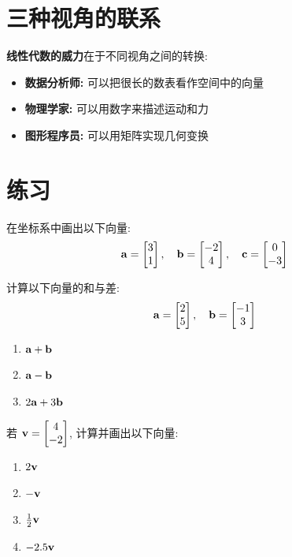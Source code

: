 \section{三种视角的联系}

\begin{summary}
\textbf{线性代数的威力}在于不同视角之间的转换:
\begin{itemize}
    \item \textbf{数据分析师:} 可以把很长的数表看作空间中的向量
    \item \textbf{物理学家:} 可以用数字来描述运动和力
    \item \textbf{图形程序员:} 可以用矩阵实现几何变换
\end{itemize}
\end{summary}

\section{练习}

\begin{exercise}
在坐标系中画出以下向量:
\[
\mathbf{a} = \begin{bmatrix} 3 \\ 1 \end{bmatrix}, \quad \mathbf{b} = \begin{bmatrix} -2 \\ 4 \end{bmatrix}, \quad \mathbf{c} = \begin{bmatrix} 0 \\ -3 \end{bmatrix}
\]
\end{exercise}

\begin{exercise}
计算以下向量的和与差:
\[
\mathbf{a} = \begin{bmatrix} 2 \\ 5 \end{bmatrix}, \quad \mathbf{b} = \begin{bmatrix} -1 \\ 3 \end{bmatrix}
\]
\begin{enumerate}[label=(\alph*)]
    \item $\mathbf{a} + \mathbf{b}$
    \item $\mathbf{a} - \mathbf{b}$
    \item $2\mathbf{a} + 3\mathbf{b}$
\end{enumerate}
\end{exercise}

\begin{exercise}
若 $\mathbf{v} = \begin{bmatrix} 4 \\ -2 \end{bmatrix}$, 计算并画出以下向量:
\begin{enumerate}[label=(\alph*)]
    \item $2\mathbf{v}$
    \item $-\mathbf{v}$
    \item $\frac{1}{2}\mathbf{v}$
    \item $-2.5\mathbf{v}$
\end{enumerate}
\end{exercise}

